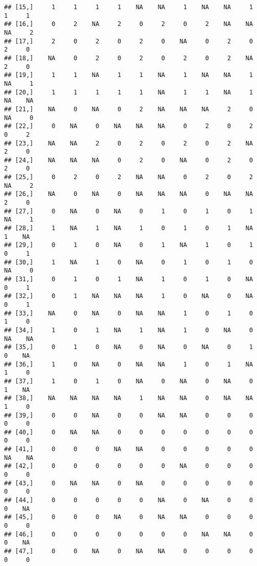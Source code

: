 \documentclass[
]{article}
\begin{document}
\begin{verbatim}
## [15,]     1     1     1     1    NA    NA     1    NA    NA     1     1     1
## [16,]     0     2    NA     2     0     2     0     2    NA    NA    NA     2
## [17,]     2     0     2     0     2     0    NA     0     2     0     2     0
## [18,]    NA     0     2     0     2     0     2     0     2    NA     2     0
## [19,]     1     1    NA     1     1    NA     1    NA    NA     1    NA     1
## [20,]     1     1     1     1     1    NA     1     1    NA     1    NA    NA
## [21,]    NA     0    NA     0     2    NA    NA    NA     2     0    NA     0
## [22,]     0    NA     0    NA    NA    NA     0     2     0     2     0     2
## [23,]    NA    NA     2     0     2     0     2     0     2    NA     2     0
## [24,]    NA    NA    NA     0     2     0    NA     0     2     0     2     0
## [25,]     0     2     0     2    NA    NA     0     2     0     2    NA     2
## [26,]    NA     0    NA     0    NA    NA    NA     0    NA    NA     2     0
## [27,]     0    NA     0    NA     0     1     0     1     0     1    NA     1
## [28,]     1    NA     1    NA     1     0     1     0     1    NA     1    NA
## [29,]     0     1     0    NA     0     1    NA     1     0     1     0     1
## [30,]     1    NA     1     0    NA     0     1     0     1     0    NA     0
## [31,]     0     1     0     1    NA     1     0     1     0    NA     0     1
## [32,]     0     1    NA    NA    NA     1     0    NA     0    NA     0     1
## [33,]    NA     0    NA     0    NA    NA     1     0     1     0     1     0
## [34,]     1     0     1    NA     1    NA     1     0    NA     0    NA    NA
## [35,]     0     1     0    NA     0    NA     0    NA     0     1     0    NA
## [36,]     1     0    NA     0    NA    NA     1     0     1    NA     1     0
## [37,]     1     0     1     0    NA     0    NA     0    NA     0     1    NA
## [38,]    NA    NA    NA    NA     1    NA    NA     0    NA    NA     1     0
## [39,]     0     0    NA     0     0    NA    NA     0     0     0     0     0
## [40,]     0    NA    NA     0     0     0     0     0     0     0     0     0
## [41,]     0     0     0    NA    NA     0     0     0     0     0    NA    NA
## [42,]     0     0     0     0     0     0    NA     0     0     0     0     0
## [43,]     0    NA    NA     0    NA     0     0     0     0     0     0     0
## [44,]     0     0     0     0     0    NA     0    NA     0     0     0    NA
## [45,]     0     0     0    NA     0    NA    NA     0     0     0     0     0
## [46,]     0     0     0     0     0     0     0    NA    NA     0     0    NA
## [47,]     0     0    NA     0    NA    NA     0     0     0     0     0     0

\end{verbatim}
\end{document}
